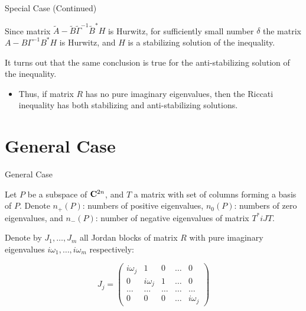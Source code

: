 \begin{frame}{Special Case (Continued)}

Since matrix $\tilde A - \tilde B\tilde\Gamma^{-1}\tilde B^{*}H$ is Hurwitz, for sufficiently small number $\delta$ the matrix $A-B\Gamma^{-1}B^{*}H$ is Hurwitz, and $H$ is a stabilizing solution of the inequality.

\begin{block}{}
It turns out that the same conclusion is true for the anti-stabilizing solution of the inequality.
\end{block}

\begin{itemize}
\item Thus, if matrix $R$ has no pure imaginary eigenvalues, then the Riccati inequality has both stabilizing and anti-stabilizing solutions. 
\end{itemize}


\end{frame}

%
%
\section{General Case}

\begin{frame}{General Case}

\begin{definition} Let $P$ be a subspace of ${\bf C}^{2n}$, and $T$ a matrix with set of columns forming a basis of $P$. Denote $n_{+}(P)$: numbers of positive eigenvalues, $n_{0}(P)$: numbers of zero eigenvalues, and $n_{-}(P)$: number of negative eigenvalues of matrix $T^{*}iJT$. 
\end{definition}


Denote by $J_{1},\ldots,J_{m}$ all Jordan blocks of matrix $R$ with pure imaginary eigenvalues $i\omega_{1},\ldots,i\omega_{m}$ respectively:

$$ J_{j} = \left(\begin{array}{ccccc} i\omega_{j} & 1 & 0 & \ldots & 0 \\
0 & i\omega_{j} & 1 & \ldots & 0 \\ \ldots & \ldots & \ldots & \ldots & \ldots \\ 0 & 0 & 0 & \ldots & i\omega_{j} \end{array}\right)
$$



\end{frame}



